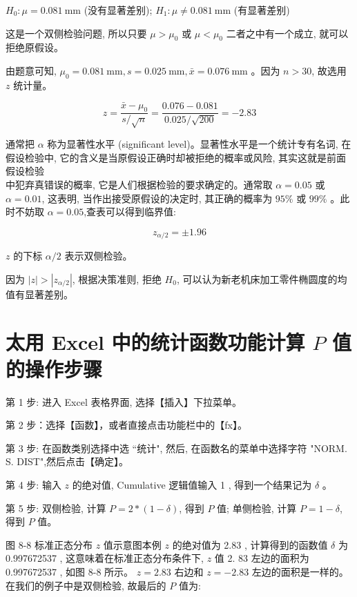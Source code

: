 \documentclass[10pt]{article}
\begin{document}
\begin{CJK*}{UTF8}{bsmi}
$H_{0}: \mu=0.081 \mathrm{~mm}$ (没有显著差别); $H_{1}: \mu \neq 0.081 \mathrm{~mm}$ (有显著差别)

这是一个双侧检验问题, 所以只要 $\mu>\mu_{0}$ 或 $\mu<\mu_{0}$ 二者之中有一个成立, 就可以拒绝原假设。

由题意可知, $\mu_{0}=0.081 \mathrm{~mm}, s=0.025 \mathrm{~mm}, \bar{x}=0.076 \mathrm{~mm}$ 。因为 $n>30$, 故选用 $z$ 统计量。

$$
z=\frac{\bar{x}-\mu_{0}}{s / \sqrt{n}}=\frac{0.076-0.081}{0.025 / \sqrt{200}}=-2.83
$$

通常把 $\alpha$ 称为显著性水平 (significant level)。显著性水平是一个统计专有名词, 在假设检验中, 它的含义是当原假设正确时却被拒绝的概率或风险, 其实这就是前面假设检验\\
中犯弃真错误的概率, 它是人们根据检验的要求确定的。通常取 $\alpha=0.05$ 或 $\alpha=0.01$, 这表明, 当作出接受原假设的决定时, 其正确的概率为 $95 \%$ 或 $99 \%$ 。此时不妨取 $\alpha=0.05$,查表可以得到临界值:

$$
z_{\alpha / 2}= \pm 1.96
$$

$z$ 的下标 $\alpha / 2$ 表示双侧检验。

因为 $|z|>\left|z_{\alpha / 2}\right|$, 根据决策准则, 拒绝 $H_{0}$, 可以认为新老机床加工零件椭圆度的均值有显著差别。

\section*{太用 Excel 中的统计函数功能计算 $P$ 值的操作步骤}
第 1 步: 进入 Excel 表格界面, 选择【插入】下拉菜单。

第 2 步：选择【函数】，或者直接点击功能栏中的【fx】。

第 3 步: 在函数类别选择中选 “统计", 然后, 在函数名的菜单中选择字符 "NORM. S. DIST",然后点击【确定】。

第 4 步: 输入 $z$ 的绝对值, Cumulative 逻辑值输入 1 , 得到一个结果记为 $\delta$ 。

第 5 步: 双侧检验, 计算 $P=2 *(1-\delta)$, 得到 $P$ 值; 单侧检验, 计算 $P=1-\delta$, 得到 $P$ 值。

\begin{center}
\end{center}

图 8-8 标准正态分布 $z$ 值示意图本例 $z$ 的绝对值为 2.83 , 计算得到的函数值 $\delta$ 为 0.997672537 , 这意味着在标准正态分布条件下, $z$ 值 2. 83 左边的面积为 0.997672537 , 如图 8-8 所示。 $z=2.83$ 右边和 $z=-2.83$ 左边的面积是一样的。在我们的例子中是双侧检验, 故最后的 $P$ 值为:


\end{CJK*}
\end{document}
